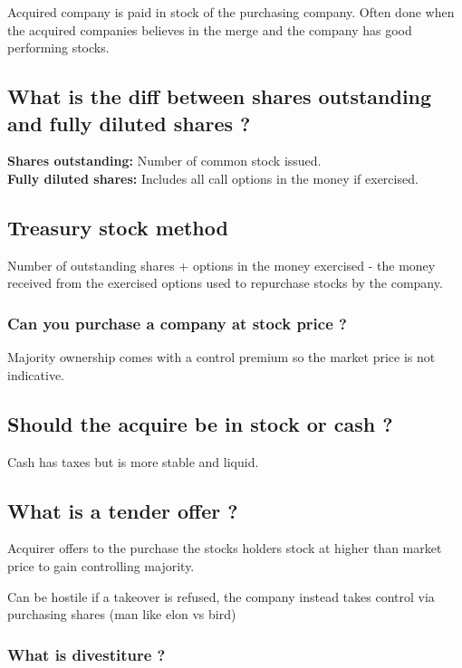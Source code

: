 \documentclass[11pt]{scrartcl} %
\begin{document}
Acquired company is paid in stock of the purchasing company. Often done when the acquired companies believes in the merge and the company has good performing stocks. 

\subsection{What is the diff between shares outstanding and fully diluted shares ?}

\textbf{Shares outstanding:}  Number of common stock issued.\\
\textbf{Fully diluted shares:} Includes all call options in the money if exercised.

\subsection{Treasury stock method}

Number of outstanding shares + options in the money exercised - the money received from the exercised options used to repurchase stocks by the company.

\subsubsection{Can you purchase a company at stock price ?}

Majority ownership comes with a control premium so the market price is not indicative.

\subsection{Should the acquire be in stock or cash ?}

Cash has taxes but is more stable and liquid. 

\subsection{What is a tender offer ?}

Acquirer offers to the purchase the stocks holders stock at higher than market price to gain controlling majority.

Can be hostile if a takeover is refused, the company instead takes control via purchasing shares (man like elon vs bird)

\subsubsection{What is divestiture ?}
\end{document}
